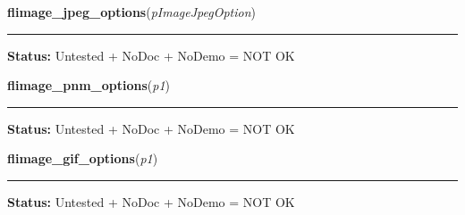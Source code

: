     \label{xformslib:flflimage:flimage_jpeg_output_options}

    \vspace{0.5ex}

\hspace{.8\funcindent}\begin{boxedminipage}{\funcwidth}

    \raggedright \textbf{flimage\_jpeg\_options}(\textit{pImageJpegOption})

    \vspace{-1.5ex}

    \rule{\textwidth}{0.5\fboxrule}
\setlength{\parskip}{2ex}
\setlength{\parskip}{1ex}
\textbf{Status:} Untested + NoDoc + NoDemo = NOT OK



    \end{boxedminipage}

    \label{xformslib:flflimage:flimage_pnm_output_options}

    \vspace{0.5ex}

\hspace{.8\funcindent}\begin{boxedminipage}{\funcwidth}

    \raggedright \textbf{flimage\_pnm\_options}(\textit{p1})

    \vspace{-1.5ex}

    \rule{\textwidth}{0.5\fboxrule}
\setlength{\parskip}{2ex}
\setlength{\parskip}{1ex}
\textbf{Status:} Untested + NoDoc + NoDemo = NOT OK



    \end{boxedminipage}

    \label{xformslib:flflimage:flimage_gif_output_options}

    \vspace{0.5ex}

\hspace{.8\funcindent}\begin{boxedminipage}{\funcwidth}

    \raggedright \textbf{flimage\_gif\_options}(\textit{p1})

    \vspace{-1.5ex}

    \rule{\textwidth}{0.5\fboxrule}
\setlength{\parskip}{2ex}
\setlength{\parskip}{1ex}
\textbf{Status:} Untested + NoDoc + NoDemo = NOT OK



    \end{boxedminipage}

